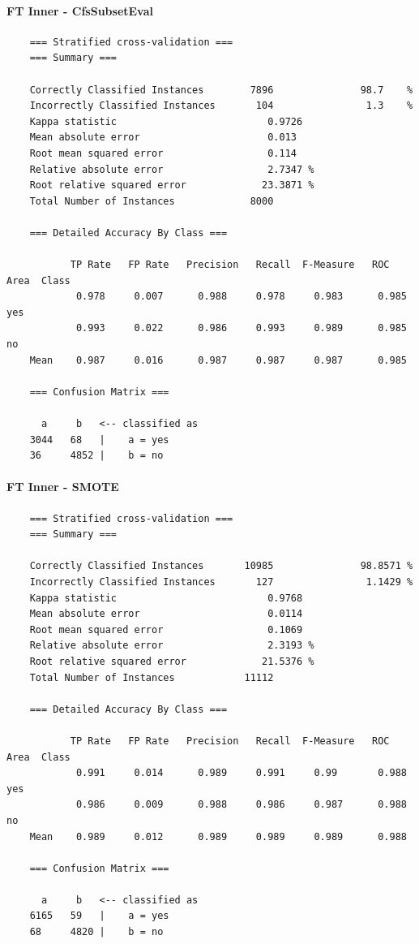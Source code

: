 \paragraph{FT Inner - CfsSubsetEval}
{\footnotesize
	\begin{verbatim}
	=== Stratified cross-validation ===
	=== Summary ===
	
	Correctly Classified Instances        7896               98.7    %
	Incorrectly Classified Instances       104                1.3    %
	Kappa statistic                          0.9726
	Mean absolute error                      0.013 
	Root mean squared error                  0.114 
	Relative absolute error                  2.7347 %
	Root relative squared error             23.3871 %
	Total Number of Instances             8000     
	
	=== Detailed Accuracy By Class ===
	
	       TP Rate   FP Rate   Precision   Recall  F-Measure   ROC Area  Class
	        0.978     0.007      0.988     0.978     0.983      0.985    yes
	        0.993     0.022      0.986     0.993     0.989      0.985    no
	Mean    0.987     0.016      0.987     0.987     0.987      0.985
	
	=== Confusion Matrix ===
	
	  a     b   <-- classified as
	3044   68   |    a = yes
	36     4852 |    b = no	
	\end{verbatim}
}

\paragraph{FT Inner - SMOTE}
{\footnotesize
	\begin{verbatim}
	=== Stratified cross-validation ===
	=== Summary ===
	
	Correctly Classified Instances       10985               98.8571 %
	Incorrectly Classified Instances       127                1.1429 %
	Kappa statistic                          0.9768
	Mean absolute error                      0.0114
	Root mean squared error                  0.1069
	Relative absolute error                  2.3193 %
	Root relative squared error             21.5376 %
	Total Number of Instances            11112     
	
	=== Detailed Accuracy By Class ===
	
	       TP Rate   FP Rate   Precision   Recall  F-Measure   ROC Area  Class
	        0.991     0.014      0.989     0.991     0.99       0.988    yes
	        0.986     0.009      0.988     0.986     0.987      0.988    no
	Mean    0.989     0.012      0.989     0.989     0.989      0.988
	
	=== Confusion Matrix ===
	
	  a     b   <-- classified as
	6165   59   |    a = yes
	68     4820 |    b = no	
	\end{verbatim}
}

